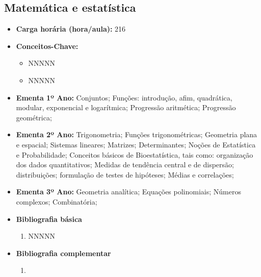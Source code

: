 \documentclass[11pt,fleqn]{book} %
\begin{document}
\newpage
\subsection{Matemática e estatística}\label{disc:matematica}
\begin{itemize}
	\item \textbf{Carga horária (hora/aula):} 216
	\item \textbf{Conceitos-Chave:}
	\begin{itemize}
		\item NNNNN
		\item NNNNN
	\end{itemize}
	\item \textbf{Ementa 1º Ano:} 
	Conjuntos;
	Funções: introdução, afim, quadrática, modular, exponencial e logarítmica;
	Progressão aritmética;
	Progressão geométrica;
	\item \textbf{Ementa 2º Ano:} 
	Trigonometria;
	Funções trigonométricas;
	Geometria plana e espacial;
	Sistemas lineares;
	Matrizes;
	Determinantes;
	Noções de Estatística e Probabilidade;
	Conceitos básicos de Bioestatística, tais como: organização dos dados quantitativos;
	Medidas de tendência central e de dispersão; distribuições; formulação de testes de hipóteses; 
	Médias e correlações;	
	\item \textbf{Ementa 3º Ano:} 
	Geometria analítica; 
	Equações polinomiais; 
	Números complexos; 
	Combinatória; 

	\item \textbf{Bibliografia básica}
	\begin{enumerate}
		\item NNNNN
	\end{enumerate}
	\item \textbf{Bibliografia complementar}
	\begin{enumerate}
		\item 
	\end{enumerate}	
\end{itemize}

\newpage
\end{document}

